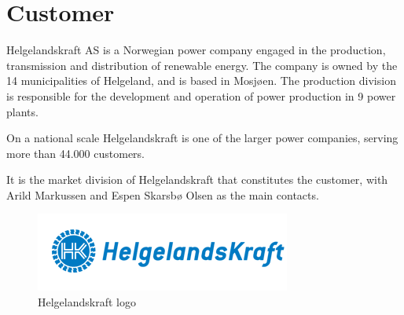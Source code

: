 \section{Customer}
Helgelandskraft AS is a Norwegian power company engaged in the production,
transmission and distribution of renewable energy. The company is owned by
the 14 municipalities of Helgeland, and is based in Mosjøen. The production
division is responsible for the development and operation of power production
in 9 power plants.

On a national scale Helgelandskraft is one of the larger power companies,
serving more than 44.000 customers.

It is the market division of Helgelandskraft that constitutes the customer,
with Arild Markussen and Espen Skarsbø Olsen as the main contacts. \cite{helgelandskraft}

\begin{figure}[H]
		\centering
		\includegraphics[scale=1.0]{pictures/helgelandskraft.png}
		\caption{Helgelandskraft logo}
	\end{figure}
